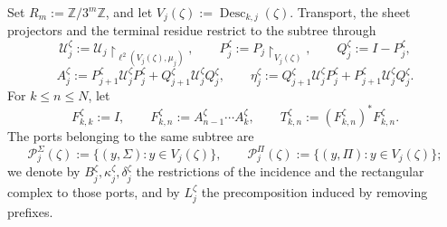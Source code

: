 Set \(R_m:=\mathbb Z/3^m\mathbb Z\), and let
\(V_j(\zeta):=\operatorname{Desc}_{k,j}(\zeta)\). Transport, the
sheet projectors and the terminal residue restrict to the subtree through
\[
 \mathcal U_j^\zeta:=
 \mathcal U_j\!\upharpoonright_{\ell^2(V_j(\zeta),\mu_j)},
 \qquad P_j^\zeta:=P_j\!\upharpoonright_{V_j(\zeta)},
 \qquad Q_j^\zeta:=I-P_j^\zeta,
\]
\[
 A_j^\zeta:=P_{j+1}^\zeta\mathcal U_j^\zeta P_j^\zeta
             +Q_{j+1}^\zeta\mathcal U_j^\zeta Q_j^\zeta,
 \qquad
 \eta_j^\zeta:=Q_{j+1}^\zeta\mathcal U_j^\zeta P_j^\zeta
             +P_{j+1}^\zeta\mathcal U_j^\zeta Q_j^\zeta.
\]
For \(k\leq n\leq N\), let
\[
 F_{k,k}^\zeta:=I,
 \qquad
 F_{k,n}^\zeta:=A_{n-1}^\zeta\cdots A_k^\zeta,
 \qquad
 T_{k,n}^\zeta:=(F_{k,n}^\zeta)^*F_{k,n}^\zeta.
\]
The ports belonging to the same subtree are
\[
 \mathscr P_j^\Sigma(\zeta):=
 \{(y,\Sigma):y\in V_j(\zeta)\},
 \qquad
 \mathscr P_j^\Pi(\zeta):=
 \{(y,\Pi):y\in V_j(\zeta)\};
\]
we denote by \(B_j^\zeta,\kappa_j^\zeta,\delta_j^\zeta\) the restrictions
of the incidence and the rectangular complex to those ports, and by
\(L_j^\zeta\) the precomposition induced by removing prefixes.

